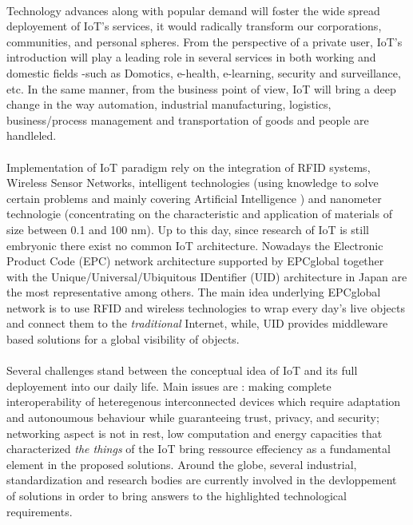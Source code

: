 \documentclass[10pt, twocolumn]{article}
\begin{document}
\paragraph{}
Technology advances along with popular demand will foster the wide spread deployement of IoT's services, it would radically transform our corporations, communities, and personal spheres. From the perspective of a private user, IoT's introduction will play a leading role in several services in both working and domestic fields -such as Domotics, e-health, e-learning, security and surveillance, etc. In the same manner, from the business point of view, IoT will bring a deep change in the way automation, industrial manufacturing, logistics, business/process management and transportation of goods and people are handleled.
\paragraph{}
Implementation of IoT paradigm rely on the integration of RFID systems, Wireless Sensor Networks, intelligent technologies (using knowledge to solve certain problems and mainly covering Artificial Intelligence \cite{ref3}) and nanometer technologie (concentrating on the characteristic and application of materials of size between 0.1 and 100 nm). Up to this day, 
since research of IoT is still embryonic there exist no common IoT architecture.
Nowadays the Electronic Product Code (EPC) network architecture supported by EPCglobal \cite{ref4} together with the Unique/Universal/Ubiquitous IDentifier (UID) architecture in Japan \cite{ref5} are the most representative among others. The main idea underlying EPCglobal network is to use RFID and wireless technologies to wrap every day's live objects and connect them to the \emph{traditional} Internet, while, UID provides middleware based solutions for a global visibility of objects.
\paragraph{}
Several challenges stand between the conceptual idea of IoT and its full deployement into our daily life. Main issues are : making complete interoperability of heteregenous interconnected devices which require adaptation and autonoumous behaviour while guaranteeing trust, privacy, and security; networking aspect is not in rest, low computation and energy capacities that characterized \emph{the things} of the IoT bring ressource effeciency as a fundamental element in the proposed solutions. Around the globe, several industrial, standardization and research bodies are currently involved in the devloppement of solutions in order to bring answers to the  highlighted technological requirements.
\end{document}
